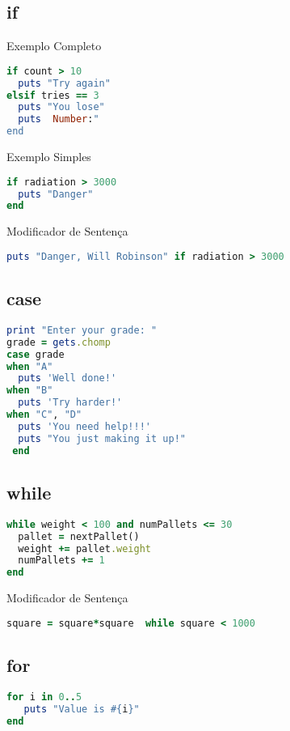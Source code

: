 \documentclass[serif,mathserif]{book}
\begin{document}
\subsection{if}
 
Exemplo Completo

\begin{lstlisting}[language=ruby]
if count > 10
  puts "Try again"
elsif tries == 3
  puts "You lose"
  puts  Number:"
end
\end{lstlisting}

Exemplo Simples

\begin{lstlisting}[language=ruby]
if radiation > 3000
  puts "Danger"
end
\end{lstlisting}

Modificador de Sentença

\begin{lstlisting}[language=ruby]
puts "Danger, Will Robinson" if radiation > 3000
\end{lstlisting}

\subsection{case} 
\begin{lstlisting}[language=ruby]
print "Enter your grade: "
grade = gets.chomp
case grade
when "A"
  puts 'Well done!'
when "B"
  puts 'Try harder!'
when "C", "D"
  puts 'You need help!!!'
  puts "You just making it up!"
 end
\end{lstlisting}


\subsection{while}
\begin{lstlisting}[language=ruby]
while weight < 100 and numPallets <= 30
  pallet = nextPallet()
  weight += pallet.weight
  numPallets += 1
end
\end{lstlisting}
 
Modificador de Sentença


\begin{lstlisting}[language=ruby]
square = square*square  while square < 1000
\end{lstlisting}

\subsection{for}
\begin{lstlisting}[language=ruby]
for i in 0..5
   puts "Value is #{i}"
end
\end{lstlisting}
\end{document}
